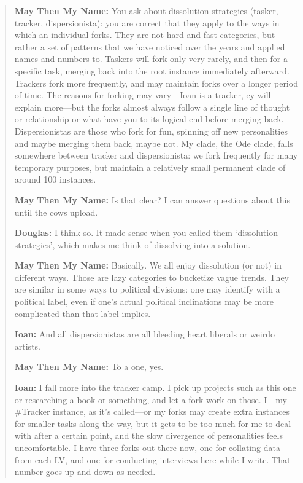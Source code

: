 \begin{quote}
\textbf{May Then My Name:} You ask about dissolution strategies (tasker, tracker, dispersionista): you are correct that they apply to the ways in which an individual forks. They are not hard and fast categories, but rather a set of patterns that we have noticed over the years and applied names and numbers to. Taskers will fork only very rarely, and then for a specific task, merging back into the root instance immediately afterward. Trackers fork more frequently, and may maintain forks over a longer period of time. The reasons for forking may vary---Ioan is a tracker, ey will explain more---but the forks almost always follow a single line of thought or relationship or what have you to its logical end before merging back. Dispersionistas are those who fork for fun, spinning off new personalities and maybe merging them back, maybe not. My clade, the Ode clade, falls somewhere between tracker and dispersionista: we fork frequently for many temporary purposes, but maintain a relatively small permanent clade of around 100 instances.

\textbf{May Then My Name:} Is that clear? I can answer questions about this until the cows upload.

\textbf{Douglas:} I think so. It made sense when you called them `dissolution strategies', which makes me think of dissolving into a solution.

\textbf{May Then My Name:} Basically. We all enjoy dissolution (or not) in different ways. Those are lazy categories to bucketize vague trends. They are similar in some ways to political divisions: one may identify with a political label, even if one's actual political inclinations may be more complicated than that label implies.

\textbf{Ioan:} And all dispersionistas are all bleeding heart liberals or weirdo artists.

\textbf{May Then My Name:} To a one, yes.

\textbf{Ioan:} I fall more into the tracker camp. I pick up projects such as this one or researching a book or something, and let a fork work on those. I---my \#Tracker instance, as it's called---or my forks may create extra instances for smaller tasks along the way, but it gets to be too much for me to deal with after a certain point, and the slow divergence of personalities feels uncomfortable. I have three forks out there now, one for collating data from each LV, and one for conducting interviews here while I write. That number goes up and down as needed.


\end{quote}
